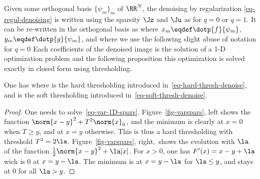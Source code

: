 Given some orthogonal basis $\{\psi_m\}_m$ of $\RR^N$, the denoising by regularization \eqref{eq-regul-denoising} is written using the sparsity $\Jz$ and $\Ju$ as 
for $q=0$ or $q=1$. It can be re-written in the orthogonal basis as
where $x_m \eqdef \dotp{f}{\psi_m}$, $y_m \eqdef \dotp{g}{\psi_m}$, and where we use the following slight abuse of notation for $q=0$
Each coefficients of the denoised image is the solution of a 1-D optimization problem
and the following proposition this optimization is solved exactly in closed form using thresholding.

\begin{prop}\label{prop-equiv-sparse-thresh}
One has
where 
is the hard thresholding introduced in~\eqref{eq-hard-thresh-denoise}, and 
is the soft thresholding introduced in~\eqref{eq-soft-thresh-denoise}.
\end{prop}

	
\begin{proof}
	One needs to solve~\eqref{eq-var-1D-spars}. Figure~\ref{fig-varspars}, left shows the function $\norm{x-y}^2+T^2 \norm{x}_0$, and the minimum is clearly at $x=0$ when $T \geq y$, and at $x=y$ otherwise. This is thus a hard thresholding with threshold $T^2=2\la$. 
	Figure~\eqref{fig-varspars}, right, shows the evolution with $\la$ of the function $\frac{1}{2}\norm{x-y}^2+\la |x|$. 
	For $x>0$, one has $F'(x)=x-y+\la$ wich is $0$ at $x=y-\la$.
	The minimum is at $x=y-\la$ for $\la \leq y$, and stays at $0$ for all $\la>y$. 
\end{proof}





